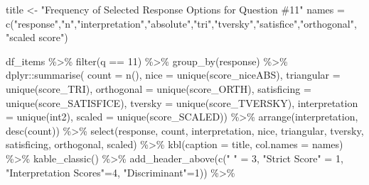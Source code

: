 \documentclass[
  letterpaper,
  DIV=11,
  numbers=noendperiod]{scrreprt}
\newenvironment{Shaded}{\begin{snugshade}}{\end{snugshade}}
\newcommand{\AttributeTok}[1]{\textcolor[rgb]{0.40,0.45,0.13}{#1}}
\newcommand{\DecValTok}[1]{\textcolor[rgb]{0.68,0.00,0.00}{#1}}
\newcommand{\FunctionTok}[1]{\textcolor[rgb]{0.28,0.35,0.67}{#1}}
\newcommand{\NormalTok}[1]{\textcolor[rgb]{0.00,0.23,0.31}{#1}}
\newcommand{\OtherTok}[1]{\textcolor[rgb]{0.00,0.23,0.31}{#1}}
\newcommand{\SpecialCharTok}[1]{\textcolor[rgb]{0.37,0.37,0.37}{#1}}
\newcommand{\StringTok}[1]{\textcolor[rgb]{0.13,0.47,0.30}{#1}}
\begin{document}
\begin{Shaded}
\begin{Highlighting}[]
\NormalTok{title }\OtherTok{\textless{}{-}} \StringTok{"Frequency of Selected Response Options for Question \#11"}
\NormalTok{names }\OtherTok{=} \FunctionTok{c}\NormalTok{(}\StringTok{"response"}\NormalTok{,}\StringTok{"n"}\NormalTok{,}\StringTok{"interpretation"}\NormalTok{,}\StringTok{"absolute"}\NormalTok{,}\StringTok{"tri"}\NormalTok{,}\StringTok{"tversky"}\NormalTok{,}\StringTok{"satisfice"}\NormalTok{,}\StringTok{"orthogonal"}\NormalTok{, }\StringTok{"scaled score"}\NormalTok{)}

\NormalTok{df\_items }\SpecialCharTok{\%\textgreater{}\%} \FunctionTok{filter}\NormalTok{(q }\SpecialCharTok{==} \DecValTok{11}\NormalTok{) }\SpecialCharTok{\%\textgreater{}\%} \FunctionTok{group\_by}\NormalTok{(response) }\SpecialCharTok{\%\textgreater{}\%}
\NormalTok{  dplyr}\SpecialCharTok{::}\FunctionTok{summarise}\NormalTok{( }\AttributeTok{count =} \FunctionTok{n}\NormalTok{(),}
                    \AttributeTok{nice =} \FunctionTok{unique}\NormalTok{(score\_niceABS),}
                    \AttributeTok{triangular =} \FunctionTok{unique}\NormalTok{(score\_TRI),}
                    \AttributeTok{orthogonal =}  \FunctionTok{unique}\NormalTok{(score\_ORTH),}
                    \AttributeTok{satisficing =}  \FunctionTok{unique}\NormalTok{(score\_SATISFICE),}
                    \AttributeTok{tversky =} \FunctionTok{unique}\NormalTok{(score\_TVERSKY),}
                    \AttributeTok{interpretation =} \FunctionTok{unique}\NormalTok{(int2),}
                    \AttributeTok{scaled =} \FunctionTok{unique}\NormalTok{(score\_SCALED)) }\SpecialCharTok{\%\textgreater{}\%}
  \FunctionTok{arrange}\NormalTok{(interpretation, }\FunctionTok{desc}\NormalTok{(count)) }\SpecialCharTok{\%\textgreater{}\%}
  \FunctionTok{select}\NormalTok{(response, count, interpretation, nice,}
\NormalTok{         triangular, tversky, satisficing, orthogonal, scaled) }\SpecialCharTok{\%\textgreater{}\%}
  \FunctionTok{kbl}\NormalTok{(}\AttributeTok{caption =}\NormalTok{ title, }\AttributeTok{col.names =}\NormalTok{ names) }\SpecialCharTok{\%\textgreater{}\%}  \FunctionTok{kable\_classic}\NormalTok{() }\SpecialCharTok{\%\textgreater{}\%}
  \FunctionTok{add\_header\_above}\NormalTok{(}\FunctionTok{c}\NormalTok{(}\StringTok{" "} \OtherTok{=} \DecValTok{3}\NormalTok{, }\StringTok{"Strict Score"} \OtherTok{=} \DecValTok{1}\NormalTok{, }\StringTok{"Interpretation Scores"}\OtherTok{=}\DecValTok{4}\NormalTok{, }\StringTok{"Discriminant"}\OtherTok{=}\DecValTok{1}\NormalTok{)) }\SpecialCharTok{\%\textgreater{}\%}

\end{Highlighting}
\end{Shaded}
\end{document}
